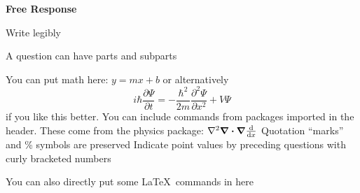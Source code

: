 \documentclass{exam}
\begin{document}
\newpage
\par\noindent \textbf{\large  Free Response}
	\par\noindent  Write legibly
\begin{questions}
	\setcounter{question}{28}
	\question A question can have parts and subparts
	\question 
	\question You can put math here: $y=mx+b$ or alternatively \[i\hbar \frac{\partial \Psi}{\partial t} = -\frac{\hbar^2}{2m}\frac{\partial^2 \Psi}{\partial x^2} + V \Psi\] if you like this better.
	\question You can include commands from packages imported in the header. These come from the physics package: $\laplacian\div\grad\dv{x}$
	\question Quotation ``marks'' and \% symbols are preserved
	\question[3]  Indicate point values by preceding questions with curly bracketed numbers
	\question You can also directly put some \LaTeX\ commands in here
		\newpage
\end{questions}
\end{document}
